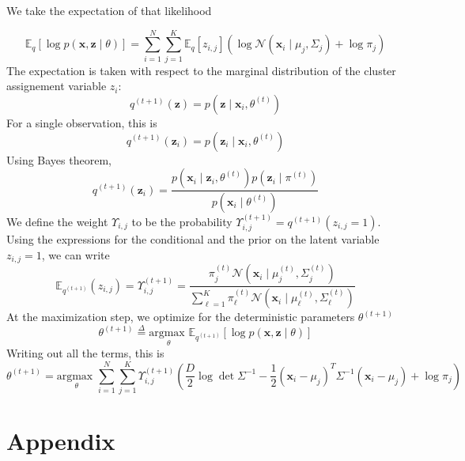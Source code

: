 \documentclass{article}
\numberwithin{equation}{section}
\begin{document}
We take the expectation of that likelihood 

$$
 \mathbb{E}_q\left[\log p(\mathbf{x}, \mathbf{z} \mid  \theta) \right] 
 =  \sum_{i = 1}^N \sum_{j = 1}^K
    \mathbb{E}_q[z_{i, j}] (\log \mathcal{N}(\mathbf{x}_i \mid \mu_j , \Sigma_j) 
    +  \log \pi_j)
$$
The expectation is taken with respect to the marginal distribution 
of the cluster assignement variable $z_i$:
$$
 q^{(t + 1)}(\mathbf{z}) = p(\mathbf{z} \mid \mathbf{x}_i , \theta^{(t)})
$$
For a single observation, this is 
$$
  q^{(t + 1)}(\mathbf{z}_i) = p(\mathbf{z}_i \mid \mathbf{x}_i , \theta^{(t)})
$$
Using Bayes theorem, 
$$
  q^{(t + 1)}(\mathbf{z}_i) = \frac{p(\mathbf{x}_i \mid \mathbf{z}_i,  \theta^{(t)}) p(\mathbf{z}_i \mid \pi^{(t)})}{p(\mathbf{x}_i \mid \theta^{(t)})}
$$
We define the weight 
$\Upsilon_{i, j}$ to be the probability 
$\Upsilon_{i, j}^{(t + 1)} = q^{(t + 1)}(z_{i, j} = 1)$.
Using the expressions for the conditional and the prior on the 
latent variable $z_{i, j} = 1$, we can write
$$
\mathbb{E}_{q^{(t + 1)}}(z_{i, j}) = 
        \Upsilon^{(t + 1)}_{i, j} = 
        \frac{
                \pi_j^{(t)} \mathcal{N}(\mathbf{x}_i \mid \mu_j^{(t)}, \Sigma_j^{(t)})
                }{
                \displaystyle \sum_{\ell = 1}^K \pi_\ell^{(t)}
                \mathcal{N}(\mathbf{x}_i \mid \mu_\ell^{(t)}, \Sigma_\ell^{(t)})
} 
$$
At the maximization step, we optimize for the deterministic parameters 
$\theta^{(t + 1)}$
$$
\theta^{(t + 1)} \overset{\Delta}{=} \underset{\theta}{\text{argmax }} 
\mathbb{E}_{q^{(t +1)}} [\log p(\mathbf{x}, \mathbf{z} \mid \theta)]
$$
Writing out all the terms, this is 
\[
        \theta^{(t+1)} =  \underset{\theta}{\text{argmax }} 
        \sum_{i = 1}^{N} \sum_{j = 1}^{K}\Upsilon_{i, j}^{(t + 1)} 
        \left( 
        \frac{D}{2}\log \det \Sigma^{-1}
        - \frac{1}{2} (\mathbf{x}_i - \mu_j)^T \Sigma^{-1} (\mathbf{x}_i - \mu_j)
        + \log \pi_j
        \right)


\]





\section{Appendix}
\end{document}
